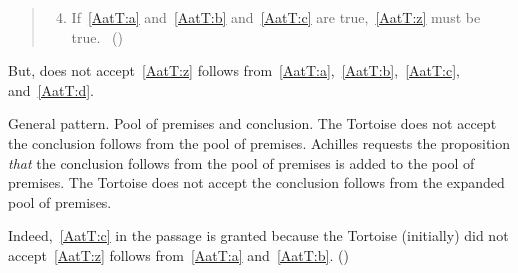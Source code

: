 \begin{note}
  \begin{quote}
    \begin{enumerate}[label=(\emph{\Alph*}), ref=\emph{\Alph*}]
      \setcounter{enumi}{3}
    \item
      \label{AatT:d}
      If~\ref{AatT:a} and~\ref{AatT:b} and~\ref{AatT:c} are true,~\ref{AatT:z} must be true.%
      \mbox{ }\hfill\mbox{(\citeyear[279]{Carroll:1895uj})}
    \end{enumerate}
  \end{quote}

  But, does not accept~\ref{AatT:z} follows from~\ref{AatT:a},~\ref{AatT:b},~\ref{AatT:c}, and~\ref{AatT:d}.

  General pattern.
  Pool of premises and conclusion.
  The Tortoise does not accept the conclusion follows from the pool of premises.
  Achilles requests the proposition \emph{that} the conclusion follows from the pool of premises is added to the pool of premises.
  The Tortoise does not accept the conclusion follows from the expanded pool of premises.

  Indeed,~\ref{AatT:c} in the passage is granted because the Tortoise (initially) did not accept~\ref{AatT:z} follows from~\ref{AatT:a} and~\ref{AatT:b}.
  (\citeyear[279]{Carroll:1895uj})
\end{note}

